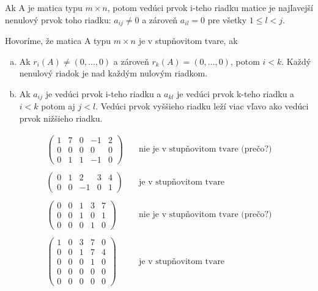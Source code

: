 \begin{definition}\label{def:veduciPrvok}
Ak A je matica typu $m \times n$, potom vedúci prvok i-teho riadku matice je
najľavejší nenulový prvok toho riadku: $a_{ij} \ne 0$ a zároveň $a_{il} = 0$ pre
všetky $1 \le l < j$.
\end{definition}

\begin{definition}
Hovoríme, že matica A typu $m \times n$ je v stupňovitom tvare, ak
\begin{enumerate}[(a)]
    \item Ak $r_i(A) \ne (0, \dots, 0)$ a zároveň $r_k(A) = (0, \dots, 0)$, potom $i < k$. Každý nenulový riadok je nad každým nulovým riadkom.
    \item Ak $a_{ij}$ je vedúci prvok i-teho riadku a $a_{kl}$ je vedúci prvok k-teho
    riadku a $i<k$ potom aj $j<l$. Vedúci prvok vyššieho riadku leží viac vľavo ako
    vedúci prvok nižšieho riadku.
\end{enumerate}
\end{definition}
\begin{example}
\[
\begin{array}{rl}
\begin{pmatrix} 1 & 7 & 0 & -1 & 2 \\ 0 & 0 & 0 & 0 & 0 \\ 0 & 1 & 1 & -1 & 0
\end{pmatrix} & 
\quad \text{nie je v stupňovitom tvare (prečo?)} \\~\\
\begin{pmatrix} 0 & 1 & 2 & 3 & 4 \\ 0 & 0 & -1 & 0 & 1 
\end{pmatrix} &
\quad\text{je v stupňovitom tvare}\\~\\
\begin{pmatrix} 0 & 0 & 1 & 3 & 7 \\ 0 & 0 & 1 & 0 & 1 \\ 0 & 0 & 0 & 1 & 0
\end{pmatrix} &
\quad \text{nie je v stupňovitom tvare (prečo?)} \\~\\
\begin{pmatrix} 1 & 0 & 3 & 7 & 0 \\ 0 & 0 & 1 & 7 & 4 \\ 0 & 0 & 0 & 1 & 0 \\ 0 & 0 & 0 & 0 & 0 \\ 0 & 0 & 0 & 0 & 0 
\end{pmatrix} &
\quad\text{je v stupňovitom tvare}
\end{array}
\]
\end{example}

